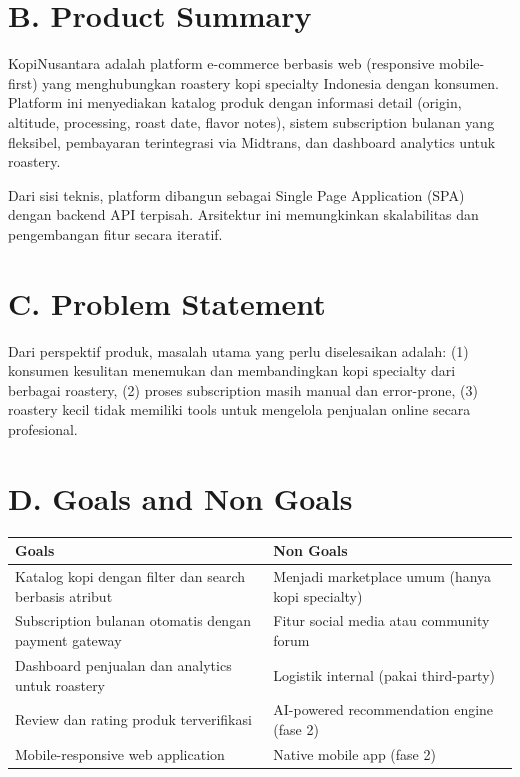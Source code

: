 \documentclass[11pt,a4paper]{article}
\begin{document}
\section{B. Product Summary}
KopiNusantara adalah platform e-commerce berbasis web (responsive mobile-first) yang menghubungkan roastery kopi specialty Indonesia dengan konsumen. Platform ini menyediakan katalog produk dengan informasi detail (origin, altitude, processing, roast date, flavor notes), sistem subscription bulanan yang fleksibel, pembayaran terintegrasi via Midtrans, dan dashboard analytics untuk roastery.

Dari sisi teknis, platform dibangun sebagai Single Page Application (SPA) dengan backend API terpisah. Arsitektur ini memungkinkan skalabilitas dan pengembangan fitur secara iteratif.

\section{C. Problem Statement}
Dari perspektif produk, masalah utama yang perlu diselesaikan adalah: (1) konsumen kesulitan menemukan dan membandingkan kopi specialty dari berbagai roastery, (2) proses subscription masih manual dan error-prone, (3) roastery kecil tidak memiliki tools untuk mengelola penjualan online secara profesional.

\section{D. Goals and Non Goals}
\noindent\small
\begin{tabularx}{\textwidth}{|X|X|}
\hline
\centering\textbf{Goals}\arraybackslash & \centering\textbf{Non Goals}\arraybackslash \\\hline
Katalog kopi dengan filter dan search berbasis atribut & Menjadi marketplace umum (hanya kopi specialty) \\\hline
Subscription bulanan otomatis dengan payment gateway & Fitur social media atau community forum \\\hline
Dashboard penjualan dan analytics untuk roastery & Logistik internal (pakai third-party) \\\hline
Review dan rating produk terverifikasi & AI-powered recommendation engine (fase 2) \\\hline
Mobile-responsive web application & Native mobile app (fase 2) \\\hline
\end{tabularx}\normalsize
\end{document}
